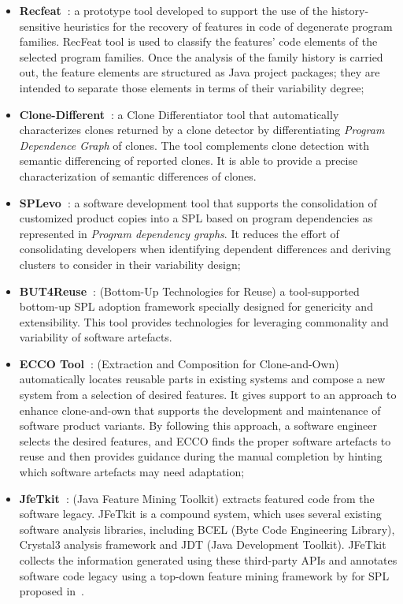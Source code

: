 \begin{itemize}
    \item \textbf{Recfeat~\cite{Nunes2012}}: a prototype tool developed to support the use of the history-sensitive heuristics for the recovery of features in code of degenerate program families. RecFeat tool is used to classify the features’ code elements of the selected program families. Once the analysis of the family history is carried out, the feature elements are structured as Java project packages; they are intended to separate those elements in terms of their variability degree;
    
    \item \textbf{Clone-Different~\cite{Xue2011}}: a Clone Differentiator tool that automatically characterizes clones returned by a clone detector by differentiating \emph{Program Dependence Graph} of clones. The tool complements clone detection with semantic differencing of reported clones. It is able to provide a precise characterization of semantic differences of clones.

    \item \textbf{SPLevo~\cite{Klatt2014}}: a software development tool that supports the consolidation of customized product copies into a SPL based on program dependencies as represented in \emph{Program dependency graphs}. It reduces the effort of consolidating developers when identifying dependent differences and deriving clusters to consider in their variability design; 
    
    \item \textbf{BUT4Reuse~\cite{Martinez2014}}: (Bottom-Up Technologies for Reuse) a tool-supported bottom-up SPL adoption framework specially designed for genericity and extensibility. This tool provides technologies for leveraging commonality and variability of software artefacts.

    \item \textbf{ECCO Tool~\cite{Fischer2015}}: (Extraction and Composition for Clone-and-Own) automatically locates reusable parts in existing systems and compose a new system from a selection of desired features. It gives support to an approach to enhance clone-and-own that supports the development and maintenance of software product variants. By following this approach, a software engineer selects the desired features, and ECCO finds the proper software artefacts to reuse and then provides guidance during the manual completion by hinting which software artefacts may need adaptation; 
    
    \item \textbf{JfeTkit~\cite{Tang2015}}: (Java Feature Mining Toolkit) extracts featured code from the software legacy. JFeTkit is a compound system, which uses several existing software analysis libraries, including BCEL (Byte Code Engineering Library), Crystal3 analysis framework and JDT (Java Development Toolkit). JFeTkit collects the information generated using these third-party APIs and annotates software code legacy using a top-down feature mining framework by for SPL proposed in~\cite{Tang2015}.

\end{itemize}

